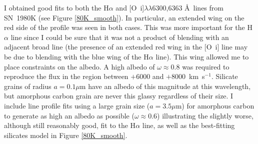 I obtained good fits to both the H$\alpha$ and [O~{\sc i}]$\lambda\lambda$6300,6363 \AA\  lines from SN~1980K (see Figure \ref{80K_smooth}).  In particular, an extended wing on the red side of the profile was seen in both cases. This was more important for the H$\alpha$ line since I could be sure that it was not a product of blending with an adjacent broad line (the presence of an extended red wing in the [O~{\sc i}] line may be due to blending with the blue wing of the H$\alpha$ line).  This wing allowed me to place constraints on the albedo.  A high albedo of $\omega\approx0.8$  was required to reproduce the flux in the region between $+6000$ and $+8000$~km~s$^{-1}$.  Silicate grains of radius $a=0.1\mu$m have an albedo of this magnitude at this wavelength, but amorphous carbon grain are never this glassy regardless of their size.  I include line profile fits using a large grain size ($a=3.5\mu$m) for amorphous carbon to generate as high an albedo as possible ($\omega\approx0.6$) illustrating the slightly worse, although still reasonably good, fit to the H$\alpha$ line, as well as the best-fitting silicates model in Figure \ref{80K_smooth}.  

